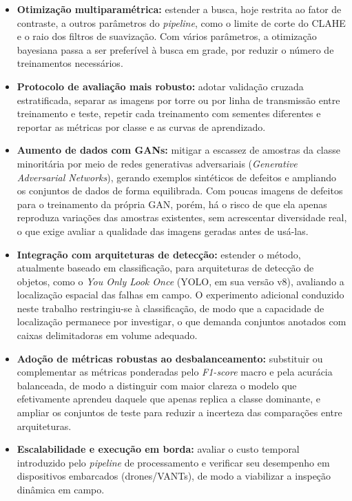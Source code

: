 \begin{itemize}
    \item \textbf{Otimização multiparamétrica:} estender a busca, hoje restrita ao fator de contraste, a outros parâmetros do \textit{pipeline}, como o limite de corte do CLAHE e o raio dos filtros de suavização. Com vários parâmetros, a otimização bayesiana \cite{snoek2012practical} passa a ser preferível à busca em grade, por reduzir o número de treinamentos necessários.
    \item \textbf{Protocolo de avaliação mais robusto:} adotar validação cruzada estratificada, separar as imagens por torre ou por linha de transmissão entre treinamento e teste, repetir cada treinamento com sementes diferentes e reportar as métricas por classe e as curvas de aprendizado.
    \item \textbf{Aumento de dados com GANs:} mitigar a escassez de amostras da classe minoritária por meio de redes generativas adversariais (\textit{Generative Adversarial Networks}), gerando exemplos sintéticos de defeitos e ampliando os conjuntos de dados de forma equilibrada. Com poucas imagens de defeitos para o treinamento da própria GAN, porém, há o risco de que ela apenas reproduza variações das amostras existentes, sem acrescentar diversidade real, o que exige avaliar a qualidade das imagens geradas antes de usá-las.
    \item \textbf{Integração com arquiteturas de detecção:} estender o método, atualmente baseado em classificação, para arquiteturas de detecção de objetos, como o \textit{You Only Look Once} (YOLO, em sua versão v8), avaliando a localização espacial das falhas em campo. O experimento adicional conduzido neste trabalho restringiu-se à classificação, de modo que a capacidade de localização permanece por investigar, o que demanda conjuntos anotados com caixas delimitadoras em volume adequado.
    \item \textbf{Adoção de métricas robustas ao desbalanceamento:} substituir ou complementar as métricas ponderadas pelo \textit{F1-score} macro e pela acurácia balanceada, de modo a distinguir com maior clareza o modelo que efetivamente aprendeu daquele que apenas replica a classe dominante, e ampliar os conjuntos de teste para reduzir a incerteza das comparações entre arquiteturas.
    \item \textbf{Escalabilidade e execução em borda:} avaliar o custo temporal introduzido pelo \textit{pipeline} de processamento e verificar seu desempenho em dispositivos embarcados (drones/VANTs), de modo a viabilizar a inspeção dinâmica em campo.
\end{itemize}

